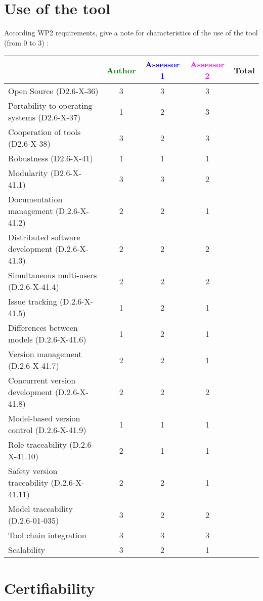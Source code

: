 \section{Use of the tool}

According WP2 requirements, give a note for characteristics of the use of the tool (from 0 to 3) :

\begin{tabular}{|l | c | c | c | c|}
\hline
& \textcolor{green}{Author} & \textcolor{blue}{Assessor 1} & \textcolor{magenta}{Assessor 2} & Total \\
\hline
Open Source (D2.6-X-36) & 3 & 3 & 3 & \\
\hline
Portability to operating systems (D2.6-X-37) & 1 & 2 &  3 & \\
\hline
Cooperation of tools (D2.6-X-38) & 3 & 2 & 3 & \\
\hline
Robustness (D2.6-X-41) & 1 & 1 & 1 & \\
\hline
Modularity (D2.6-X-41.1) & 3 & 3 & 2 & \\
\hline
Documentation management (D.2.6-X-41.2) & 2 & 2 & 1  & \\
\hline
Distributed software development (D.2.6-X-41.3) & 2 & 2 & 2 & \\
\hline
Simultaneous multi-users (D.2.6-X-41.4) & 2 & 2 & 2 & \\
\hline
Issue tracking (D.2.6-X-41.5) & 1 & 2 & 1 & \\
\hline
Differences between models (D.2.6-X-41.6) & 1 & 2 & 1 & \\
\hline
Version management (D.2.6-X-41.7) & 2 & 2 & 1 & \\
\hline
Concurrent version development (D.2.6-X-41.8) & 2 & 2 & 2 & \\
\hline
Model-based version control (D.2.6-X-41.9) & 1 & 1 & 1 & \\
\hline
Role traceability (D.2.6-X-41.10) & 2 & 1 & 1 & \\
\hline
Safety version traceability (D.2.6-X-41.11) & 2 & 2 & 1 & \\
\hline
Model traceability (D.2.6-01-035) & 3 & 2 & 2 & \\
\hline
Tool chain integration & 3 & 3 & 3 & \\
\hline
Scalability & 3 & 2 & 1 & \\
\hline
\end{tabular}

\section{Certifiability}

